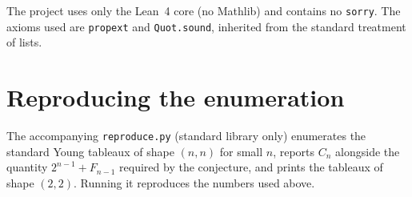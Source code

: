 \documentclass[11pt]{article}
\theoremstyle{remark}
\begin{document}
The project uses only the Lean~4 core (no Mathlib) and contains no
\texttt{sorry}. The axioms used are \texttt{propext} and \texttt{Quot.sound},
inherited from the standard treatment of lists.

\section{Reproducing the enumeration}

The accompanying \texttt{reproduce.py} (standard library only) enumerates the
standard Young tableaux of shape $(n,n)$ for small $n$, reports $C_n$ alongside
the quantity $2^{n-1} + F_{n-1}$ required by the conjecture, and prints the
tableaux of shape $(2,2)$. Running it reproduces the numbers used above.
\end{document}
